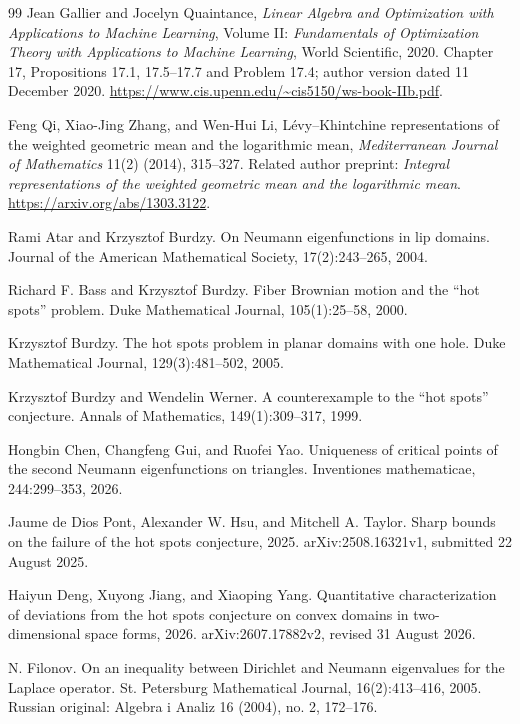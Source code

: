 \begin{thebibliography}{99}
Jean Gallier and Jocelyn Quaintance,
\emph{Linear Algebra and Optimization with Applications to Machine
Learning}, Volume II: \emph{Fundamentals of Optimization Theory with
Applications to Machine Learning}, World Scientific, 2020.
Chapter 17, Propositions 17.1, 17.5--17.7 and Problem 17.4;
author version dated 11 December 2020.
\url{https://www.cis.upenn.edu/~cis5150/ws-book-IIb.pdf}.

Feng Qi, Xiao-Jing Zhang, and Wen-Hui Li,
L\'evy--Khintchine representations of the weighted geometric mean
and the logarithmic mean,
\emph{Mediterranean Journal of Mathematics} 11(2) (2014), 315--327.
Related author preprint: \emph{Integral representations of the weighted
geometric mean and the logarithmic mean}.
\url{https://arxiv.org/abs/1303.3122}.

Rami Atar and Krzysztof Burdzy. On Neumann eigenfunctions in lip domains. Journal of the American Mathematical Society, 17(2):243--265, 2004.

Richard F. Bass and Krzysztof Burdzy. Fiber Brownian motion and the ``hot spots'' problem. Duke Mathematical Journal, 105(1):25--58, 2000.

Krzysztof Burdzy. The hot spots problem in planar domains with one hole. Duke Mathematical Journal, 129(3):481--502, 2005.

Krzysztof Burdzy and Wendelin Werner. A counterexample to the ``hot spots'' conjecture. Annals of Mathematics, 149(1):309--317, 1999.

Hongbin Chen, Changfeng Gui, and Ruofei Yao. Uniqueness of critical points of the second Neumann eigenfunctions on triangles. Inventiones mathematicae, 244:299--353, 2026.

Jaume de Dios Pont, Alexander W. Hsu, and Mitchell A. Taylor. Sharp bounds on the failure of the hot spots conjecture, 2025. arXiv:2508.16321v1, submitted 22 August 2025.

Haiyun Deng, Xuyong Jiang, and Xiaoping Yang. Quantitative characterization of deviations from the hot spots conjecture on convex domains in two-dimensional space forms, 2026. arXiv:2607.17882v2, revised 31 August 2026.

N. Filonov. On an inequality between Dirichlet and Neumann eigenvalues for the Laplace operator. St. Petersburg Mathematical Journal, 16(2):413--416, 2005. Russian original: Algebra i Analiz 16 (2004), no. 2, 172--176.


\end{thebibliography}
